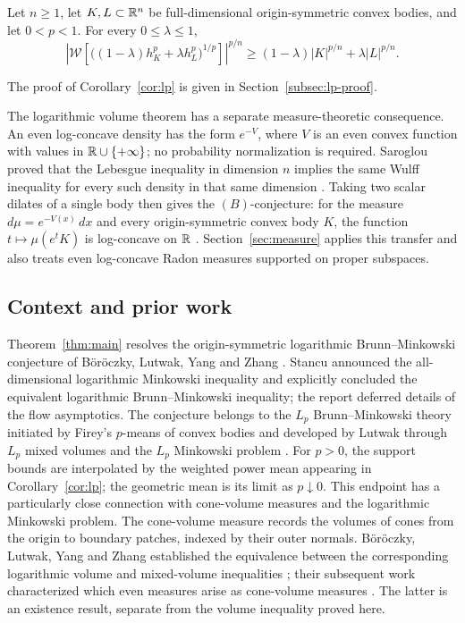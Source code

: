 \begin{corollary}
\label{cor:lp}
Let $n\ge1$, let $K,L\subset\mathbb R^n$ be full-dimensional origin-symmetric
convex bodies, and let $0<p<1$. For every $0\le\lambda\le1$,
\begin{equation}\label{eq:lp}
 \left|\mathcal W\!\left[
  \bigl((1-\lambda)h_K^p+\lambda h_L^p\bigr)^{1/p}
 \right]\right|^{p/n}
 \ge (1-\lambda)|K|^{p/n}+\lambda|L|^{p/n}.
\end{equation}
\end{corollary}

The proof of Corollary~\ref{cor:lp} is given in
Section~\ref{subsec:lp-proof}.


The logarithmic volume theorem has a separate measure-theoretic consequence.
An even log-concave density has the form $e^{-V}$, where $V$ is an even
convex function with values in $\mathbb R\cup\{+\infty\}$; no probability
normalization is required. Saroglou proved that the Lebesgue inequality in
dimension $n$ implies the same Wulff inequality for every such density in
that same dimension \cite[Theorem~3.1]{Saroglou2016}.
Taking two scalar dilates of a single body then gives the $(B)$-conjecture:
for the measure $d\mu=e^{-V(x)}\,dx$ and every origin-symmetric convex body
$K$, the function $t\mapsto\mu(e^tK)$ is log-concave on $\mathbb R$
\cite[Corollary~3.2]{Saroglou2016}.
Section~\ref{sec:measure} applies this transfer and also treats even
log-concave Radon measures supported on proper subspaces.

\subsection*{Context and prior work}
Theorem~\ref{thm:main} resolves the origin-symmetric logarithmic
Brunn--Minkowski conjecture of B\"or\"oczky, Lutwak, Yang and Zhang
\cite[Problem~1.1]{BLZY2012}.
Stancu \cite[Theorem~2, p.~3264]{Stancu2018} announced the
all-dimensional logarithmic Minkowski inequality and explicitly concluded
the equivalent logarithmic Brunn--Minkowski inequality; the report deferred
details of the flow asymptotics.
The conjecture belongs to the $L_p$ Brunn--Minkowski theory initiated
by Firey's $p$-means of convex bodies
\cite{Firey1962} and developed by Lutwak through $L_p$ mixed volumes
and the $L_p$ Minkowski problem \cite{Lutwak1993}.
For $p>0$, the support bounds are interpolated by the weighted power
mean appearing in Corollary~\ref{cor:lp}; the geometric mean is
its limit as $p\downarrow0$. This endpoint has a particularly close
connection with cone-volume measures and the logarithmic Minkowski
problem. The cone-volume measure records the volumes of cones from the
origin to boundary patches, indexed by their outer normals. B\"or\"oczky, Lutwak, Yang and Zhang established the equivalence
between the corresponding logarithmic volume and mixed-volume inequalities
\cite[Lemma~3.2]{BLZY2012}; their subsequent work characterized which even
measures arise as cone-volume measures \cite[Theorem~1.1]{BLYZ2013}. The latter is an existence result,
separate from the volume inequality proved here.

